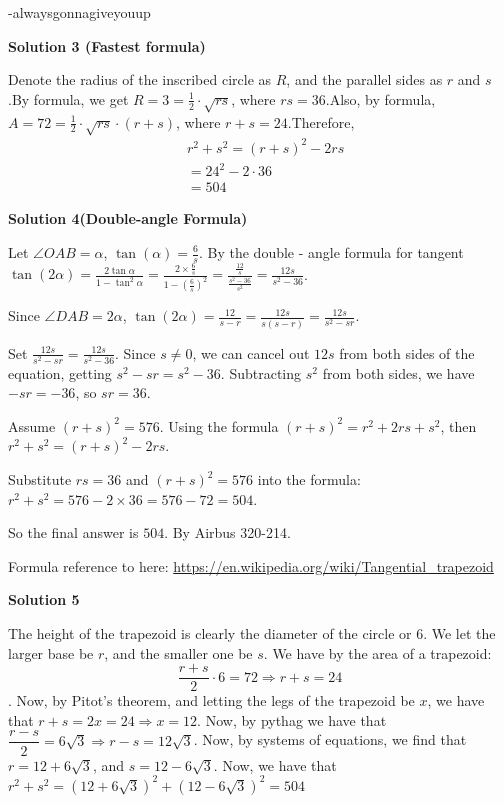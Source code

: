 \begin{enumerate}
 -alwaysgonnagiveyouup

 



\textbf{Solution 3 (Fastest formula)}

Denote the radius of the inscribed circle as $R$, and the parallel sides as $r$ and $s$.By formula, we get $R = 3 = \frac{1}{2} \cdot \sqrt{rs}$, where $rs = 36$.Also, by formula, $A = 72 = \frac{1}{2} \cdot \sqrt{rs} \cdot (r + s)$, where $r + s = 24$.Therefore, 
 \begin{align*} &r^2 + s^2 = (r + s)^2 - 2rs \\ &= 24^2 - 2 \cdot 36 \\ &= \boxed{504} \end{align*}





\textbf{Solution 4(Double-angle Formula)}

Let \(\angle OAB = \alpha\), \(\tan(\alpha)=\frac{6}{s}\). By the double - angle formula for tangent \(\tan(2\alpha)=\frac{2\tan\alpha}{1-\tan^{2}\alpha}=\frac{2\times\frac{6}{s}}{1 - (\frac{6}{s})^{2}}=\frac{\frac{12}{s}}{\frac{s^{2}-36}{s^{2}}}=\frac{12s}{s^{2}-36}\).

 Since \(\angle DAB = 2\alpha\), \(\tan(2\alpha)=\frac{12}{s - r}=\frac{12s}{s(s - r)}=\frac{12s}{s^{2}-sr}\).

 Set \(\frac{12s}{s^{2}-sr}=\frac{12s}{s^{2}-36}\). Since \(s\neq0\), we can cancel out \(12s\) from both sides of the equation, getting \(s^{2}-sr=s^{2}-36\). Subtracting \(s^{2}\) from both sides, we have \(-sr=-36\), so \(sr = 36\).

 Assume \((r + s)^{2}=576\). Using the formula \((r + s)^{2}=r^{2}+2rs + s^{2}\), then \(r^{2}+s^{2}=(r + s)^{2}-2rs\).

 Substitute \(rs = 36\) and \((r + s)^{2}=576\) into the formula: \(r^{2}+s^{2}=576-2\times36=576 - 72=504\).

 So the final answer is \(504\). By Airbus 320-214.

 Formula reference to here: \href{https://en.wikipedia.org/wiki/Tangential\_trapezoid}{https://en.wikipedia.org/wiki/Tangential\_trapezoid}

 


 



\textbf{Solution 5}

The height of the trapezoid is clearly the diameter of the circle or $6$. We let the larger base be $r$, and the smaller one be $s$. We have by the area of a trapezoid: 
 \[\dfrac{r+s}{2} \cdot 6 = 72 \Longrightarrow r+s = 24\]. Now, by Pitot's theorem, and letting the legs of the trapezoid be $x$, we have that $r+s = 2x = 24 \Longrightarrow x = 12$. Now, by pythag we have that $\dfrac{r-s}{2} = 6\sqrt3 \Longrightarrow r-s = 12\sqrt3$. Now, by systems of equations, we find that $r = 12+6\sqrt3$, and $s = 12-6\sqrt3$. Now, we have that $r^2 + s^2 = (12+6\sqrt3)^2+(12-6\sqrt3)^2 = \boxed{504}$


\end{enumerate}
